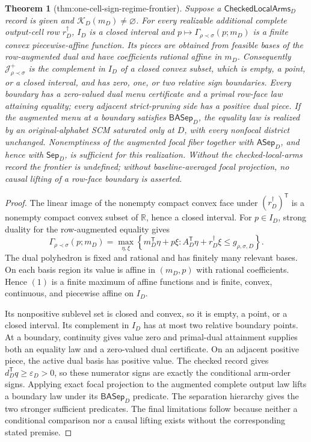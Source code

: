 \documentclass{article}
\newtheorem{theorem}{Theorem}
\begin{document}
\begin{theorem}[thm:one-cell-sign-regime-frontier]\label{thm:one-cell-sign-regime-frontier}
Suppose a \(\mathsf{CheckedLocalArms}_D\) record is given and \(\mathcal K_D(m_D)\ne\varnothing\).  For every realizable additional complete output-cell row \(r_D^\dagger\), \(I_D\) is a closed interval and \(p\mapsto\Gamma_{\rho\prec\sigma}(p;m_D)\) is a finite convex piecewise-affine function.  Its pieces are obtained from feasible bases of the row-augmented dual and have coefficients rational affine in \(m_D\).  Consequently \(\mathcal J_{\rho\prec\sigma}^+\) is the complement in \(I_D\) of a closed convex subset, which is empty, a point, or a closed interval, and has zero, one, or two relative sign boundaries.  Every boundary has a zero-valued dual menu certificate and a primal row-face law attaining equality; every adjacent strict-pruning side has a positive dual piece.  If the augmented menu at a boundary satisfies \(\mathsf{BASep}_D\), the equality law is realized by an original-alphabet SCM saturated only at \(D\), with every nonfocal district unchanged.  Nonemptiness of the augmented focal fiber together with \(\mathsf{ASep}_D\), and hence with \(\mathsf{Sep}_D\), is sufficient for this realization.  Without the checked-local-arms record the frontier is undefined; without baseline-averaged focal projection, no causal lifting of a row-face boundary is asserted.
\end{theorem}
\begin{proof}
The linear image of the nonempty compact convex face under \((r_D^\dagger)^{\mathsf T}\) is a nonempty compact convex subset of \(\mathbb R\), hence a closed interval.  For \(p\in I_D\), strong duality for the row-augmented equality gives
\[
\Gamma_{\rho\prec\sigma}(p;m_D)
=\max_{\eta,\xi}
\left\{m_D^{\mathsf T}\eta+p\xi:
A_D^{\mathsf T}\eta+r_D^\dagger\xi
\leq g_{\rho,\sigma,D}\right\}.
\tag{1}
\]
The dual polyhedron is fixed and rational and has finitely many relevant bases.  On each basis region its value is affine in \((m_D,p)\) with rational coefficients.  Hence \((1)\) is a finite maximum of affine functions and is finite, convex, continuous, and piecewise affine on \(I_D\).

Its nonpositive sublevel set is closed and convex, so it is empty, a point, or a closed interval.  Its complement in \(I_D\) has at most two relative boundary points.  At a boundary, continuity gives value zero and primal-dual attainment supplies both an equality law and a zero-valued dual certificate.  On an adjacent positive piece, the active dual basis has positive value.  The checked record gives \(d_D^{\mathsf T}q\geq\varepsilon_D>0\), so these numerator signs are exactly the conditional arm-order signs.  Applying exact focal projection to the augmented complete output law lifts a boundary law under its \(\mathsf{BASep}_D\) predicate.  The separation hierarchy gives the two stronger sufficient predicates.  The final limitations follow because neither a conditional comparison nor a causal lifting exists without the corresponding stated premise.
\end{proof}
\end{document}
